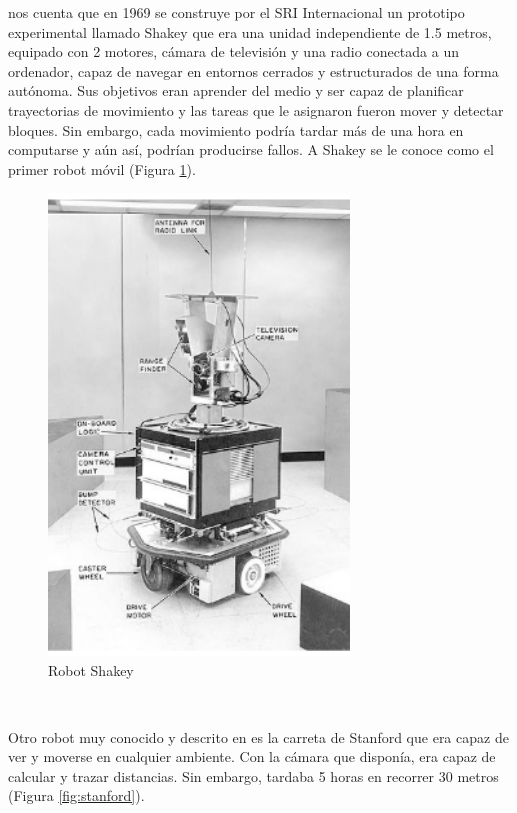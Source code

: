 \cite{nilsson1984shakey} nos cuenta que en 1969 se construye por el \ac{SRI} Internacional un prototipo experimental llamado Shakey que era una unidad independiente de 1.5 metros, equipado con 2 motores, cámara de televisión y una radio conectada a un ordenador, capaz de navegar en entornos cerrados y estructurados de una forma autónoma. Sus objetivos eran aprender del medio y ser capaz de planificar trayectorias de movimiento y las tareas que le asignaron fueron mover y detectar bloques. Sin embargo, cada movimiento podría tardar más de una hora en computarse y aún así, podrían producirse fallos. A Shakey se le conoce como el primer robot móvil (Figura \ref{fig:shakey}). \\

\begin{figure} [h!]
	\begin{center}
		\includegraphics[width=8cm]{figs/shakey.png}
	\end{center}
	\caption{Robot Shakey} %
	\label{fig:shakey}
\end{figure}\


Otro robot muy conocido  y descrito en \cite{earnest2012stanfordcart} es la carreta de Stanford que era capaz de ver y moverse en cualquier ambiente. Con la cámara que disponía, era capaz de calcular y trazar distancias. Sin embargo, tardaba 5 horas en recorrer 30 metros (Figura \ref{fig:stanford}). 

